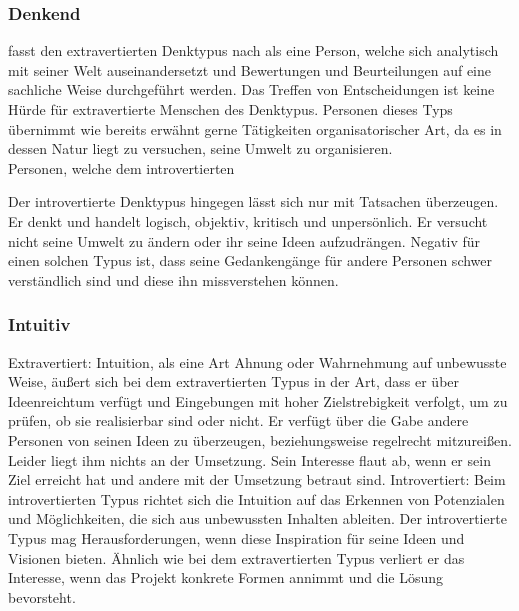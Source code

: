 \noindent
\cite{jung_2014}
\subsubsection{Denkend}
\citeauthor{jung_2014} fasst den extravertierten Denktypus nach \citeauthor{jung_1921} als eine Person, welche sich analytisch mit seiner Welt auseinandersetzt und Bewertungen und Beurteilungen auf eine sachliche Weise durchgeführt werden. Das Treffen von Entscheidungen ist keine Hürde für extravertierte Menschen des Denktypus. Personen dieses Typs übernimmt wie bereits erwähnt gerne Tätigkeiten organisatorischer Art, da es in dessen Natur liegt zu versuchen, seine Umwelt zu organisieren.\\
Personen, welche dem introvertierten 



Der introvertierte Denktypus hingegen lässt sich nur mit Tatsachen überzeugen. 
Er denkt und handelt logisch, objektiv, kritisch und unpersönlich. Er versucht nicht 
seine Umwelt zu ändern oder ihr seine Ideen aufzudrängen. Negativ für einen solchen Typus ist, dass seine Gedankengänge für andere Personen schwer verständlich 
sind und diese ihn missverstehen können.
\subsubsection{Intuitiv}
Extravertiert: 
Intuition, als eine Art Ahnung oder Wahrnehmung auf unbewusste Weise, äußert sich 
bei dem extravertierten Typus in der Art, dass er über Ideenreichtum verfügt und 
Eingebungen mit hoher Zielstrebigkeit verfolgt, um zu prüfen, ob sie realisierbar sind 
oder nicht. Er verfügt über die Gabe andere Personen von seinen Ideen zu überzeugen, 
beziehungsweise regelrecht mitzureißen. Leider liegt ihm nichts an der Umsetzung. 
Sein Interesse flaut ab, wenn er sein Ziel erreicht hat und andere mit der Umsetzung 
betraut sind. 
Introvertiert: 
Beim introvertierten Typus richtet sich die Intuition auf das Erkennen von Potenzialen und Möglichkeiten, die sich aus unbewussten Inhalten ableiten. Der introvertierte 
Typus mag Herausforderungen, wenn diese Inspiration für seine Ideen und Visionen 
bieten. Ähnlich wie bei dem extravertierten Typus verliert er das Interesse, wenn das 
Projekt konkrete Formen annimmt und die Lösung bevorsteht.
